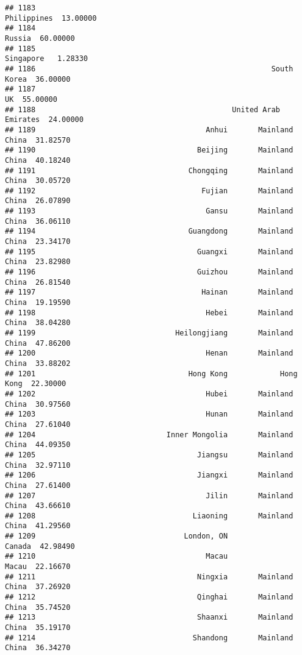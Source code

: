 \documentclass[
]{article}
\begin{document}
\begin{verbatim}
## 1183                                                      Philippines  13.00000
## 1184                                                           Russia  60.00000
## 1185                                                        Singapore   1.28330
## 1186                                                      South Korea  36.00000
## 1187                                                               UK  55.00000
## 1188                                             United Arab Emirates  24.00000
## 1189                                       Anhui       Mainland China  31.82570
## 1190                                     Beijing       Mainland China  40.18240
## 1191                                   Chongqing       Mainland China  30.05720
## 1192                                      Fujian       Mainland China  26.07890
## 1193                                       Gansu       Mainland China  36.06110
## 1194                                   Guangdong       Mainland China  23.34170
## 1195                                     Guangxi       Mainland China  23.82980
## 1196                                     Guizhou       Mainland China  26.81540
## 1197                                      Hainan       Mainland China  19.19590
## 1198                                       Hebei       Mainland China  38.04280
## 1199                                Heilongjiang       Mainland China  47.86200
## 1200                                       Henan       Mainland China  33.88202
## 1201                                   Hong Kong            Hong Kong  22.30000
## 1202                                       Hubei       Mainland China  30.97560
## 1203                                       Hunan       Mainland China  27.61040
## 1204                              Inner Mongolia       Mainland China  44.09350
## 1205                                     Jiangsu       Mainland China  32.97110
## 1206                                     Jiangxi       Mainland China  27.61400
## 1207                                       Jilin       Mainland China  43.66610
## 1208                                    Liaoning       Mainland China  41.29560
## 1209                                  London, ON               Canada  42.98490
## 1210                                       Macau                Macau  22.16670
## 1211                                     Ningxia       Mainland China  37.26920
## 1212                                     Qinghai       Mainland China  35.74520
## 1213                                     Shaanxi       Mainland China  35.19170
## 1214                                    Shandong       Mainland China  36.34270

\end{verbatim}
\end{document}
